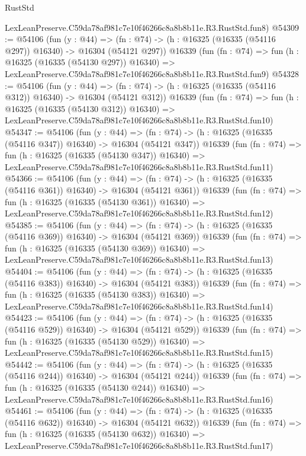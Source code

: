 \begin{lexlean}{RustStd}
\begin{coremodule}
    LexLeanPreserve.C59da78af981c7e10f46266c8a8b8b11e.R3.RustStd.fun8)
@54309 := @54106
    (fun (y : @44) =>
    (fn : @74) -> (h : @16325 (@16335 (@54116 @297)) @16340) -> @16304 (@54121 @297))
    @16339
    (fun (fn : @74) =>
    fun (h : @16325 (@16335 (@54130 @297)) @16340) =>
    LexLeanPreserve.C59da78af981c7e10f46266c8a8b8b11e.R3.RustStd.fun9)
@54328 := @54106
    (fun (y : @44) =>
    (fn : @74) -> (h : @16325 (@16335 (@54116 @312)) @16340) -> @16304 (@54121 @312))
    @16339
    (fun (fn : @74) =>
    fun (h : @16325 (@16335 (@54130 @312)) @16340) =>
    LexLeanPreserve.C59da78af981c7e10f46266c8a8b8b11e.R3.RustStd.fun10)
@54347 := @54106
    (fun (y : @44) =>
    (fn : @74) -> (h : @16325 (@16335 (@54116 @347)) @16340) -> @16304 (@54121 @347))
    @16339
    (fun (fn : @74) =>
    fun (h : @16325 (@16335 (@54130 @347)) @16340) =>
    LexLeanPreserve.C59da78af981c7e10f46266c8a8b8b11e.R3.RustStd.fun11)
@54366 := @54106
    (fun (y : @44) =>
    (fn : @74) -> (h : @16325 (@16335 (@54116 @361)) @16340) -> @16304 (@54121 @361))
    @16339
    (fun (fn : @74) =>
    fun (h : @16325 (@16335 (@54130 @361)) @16340) =>
    LexLeanPreserve.C59da78af981c7e10f46266c8a8b8b11e.R3.RustStd.fun12)
@54385 := @54106
    (fun (y : @44) =>
    (fn : @74) -> (h : @16325 (@16335 (@54116 @369)) @16340) -> @16304 (@54121 @369))
    @16339
    (fun (fn : @74) =>
    fun (h : @16325 (@16335 (@54130 @369)) @16340) =>
    LexLeanPreserve.C59da78af981c7e10f46266c8a8b8b11e.R3.RustStd.fun13)
@54404 := @54106
    (fun (y : @44) =>
    (fn : @74) -> (h : @16325 (@16335 (@54116 @383)) @16340) -> @16304 (@54121 @383))
    @16339
    (fun (fn : @74) =>
    fun (h : @16325 (@16335 (@54130 @383)) @16340) =>
    LexLeanPreserve.C59da78af981c7e10f46266c8a8b8b11e.R3.RustStd.fun14)
@54423 := @54106
    (fun (y : @44) =>
    (fn : @74) -> (h : @16325 (@16335 (@54116 @529)) @16340) -> @16304 (@54121 @529))
    @16339
    (fun (fn : @74) =>
    fun (h : @16325 (@16335 (@54130 @529)) @16340) =>
    LexLeanPreserve.C59da78af981c7e10f46266c8a8b8b11e.R3.RustStd.fun15)
@54442 := @54106
    (fun (y : @44) =>
    (fn : @74) -> (h : @16325 (@16335 (@54116 @244)) @16340) -> @16304 (@54121 @244))
    @16339
    (fun (fn : @74) =>
    fun (h : @16325 (@16335 (@54130 @244)) @16340) =>
    LexLeanPreserve.C59da78af981c7e10f46266c8a8b8b11e.R3.RustStd.fun16)
@54461 := @54106
    (fun (y : @44) =>
    (fn : @74) -> (h : @16325 (@16335 (@54116 @632)) @16340) -> @16304 (@54121 @632))
    @16339
    (fun (fn : @74) =>
    fun (h : @16325 (@16335 (@54130 @632)) @16340) =>
    LexLeanPreserve.C59da78af981c7e10f46266c8a8b8b11e.R3.RustStd.fun17)

\end{coremodule}
\end{lexlean}
